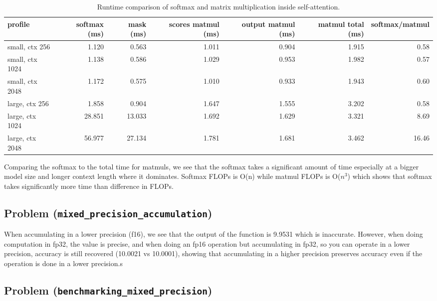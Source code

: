 \documentclass[11pt]{article}
\begin{document}
\begin{table}[H]
\centering
\scriptsize
\caption{Runtime comparison of softmax and matrix multiplication inside self-attention.}
\setlength{\tabcolsep}{3pt}
\begin{tabular}{lrrrrrr}
\toprule
profile & softmax (ms) & mask (ms) & scores matmul (ms) & output matmul (ms) & matmul total (ms) & softmax/matmul \\
\midrule
small, ctx 256 & 1.120 & 0.563 & 1.011 & 0.904 & 1.915 & 0.58 \\
small, ctx 1024 & 1.138 & 0.586 & 1.029 & 0.953 & 1.982 & 0.57 \\
small, ctx 2048 & 1.172 & 0.575 & 1.010 & 0.933 & 1.943 & 0.60 \\
large, ctx 256 & 1.858 & 0.904 & 1.647 & 1.555 & 3.202 & 0.58 \\
large, ctx 1024 & 28.851 & 13.033 & 1.692 & 1.629 & 3.321 & 8.69 \\
large, ctx 2048 & 56.977 & 27.134 & 1.781 & 1.681 & 3.462 & 16.46 \\
\bottomrule
\end{tabular}
\end{table}

Comparing the softmax to the total time for matmuls, we see that the softmax takes a significant amount of time especially at a bigger model size and longer context length where it dominates. 
Softmax FLOPs is O(n) while matmul FLOPs is O($n^3$) which shows that softmax takes significantly more time than difference in FLOPs.

\subsection{Problem (\texttt{mixed\_precision\_accumulation})}

When accumulating in a lower precision (f16), we see that the output of the function is 9.9531 which is inaccurate.
However, when doing computation in fp32, the value is precise, and when doing an fp16 operation but accumulating in fp32,
so you can operate in a lower precision, accuracy is still recovered (10.0021 vs 10.0001), showing that accumulating in a higher
precision preserves accuracy even if the operation is done in a lower precision.s

\vspace{4em}


\subsection{Problem (\texttt{benchmarking\_mixed\_precision})}
\end{document}
